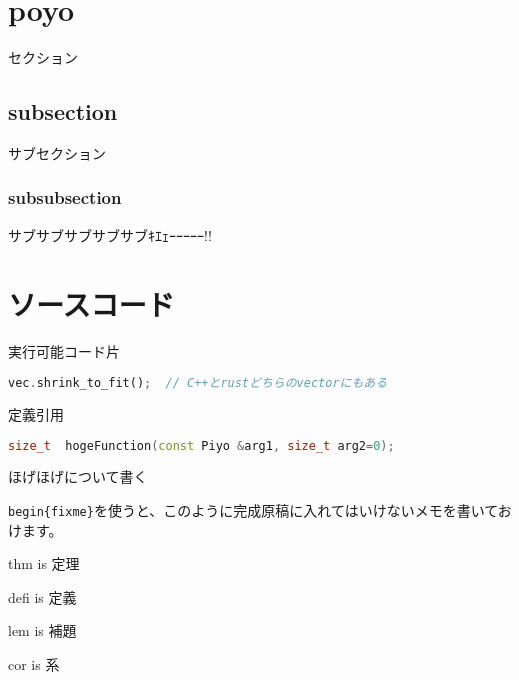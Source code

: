 \documentclass[\rootpath/article.tex]{subfiles}
\begin{document}
\label{14-poyotaro:ch:create-poyopoyo}

\section{poyo}
    セクション

    \subsection{subsection}
        サブセクション

        \subsubsection{subsubsection}
            サブサブサブサブサブｷｴｪｰｰｰｰｰ!!

\section{ソースコード}

    実行可能コード片

    \noindent\begin{minipage}{\textwidth}\mbox{}
\begin{lstlisting}[language=rust,style=code,caption={コードの例}]
vec.shrink_to_fit();  // C++とrustどちらのvectorにもある
\end{lstlisting}%
    \end{minipage}

    定義引用

    \noindent\begin{minipage}{\textwidth}\mbox{}
\begin{lstlisting}[language=c++,style=decleration,caption={宣言の例}]
size_t  hogeFunction(const Piyo &arg1, size_t arg2=0);
\end{lstlisting}%
    \end{minipage}

    \begin{fixme}
        ほげほげについて書く

        \lstinline[language=tex]|begin{fixme}|を使うと、このように完成原稿に入れてはいけないメモを書いておけます。
    \end{fixme}

    \begin{thm}
        thm is 定理
    \end{thm}
    \begin{defi}
        defi is 定義
    \end{defi}
    \begin{lem}
        lem is 補題
    \end{lem}
    \begin{cor}
        cor is 系
    \end{cor}
\end{document}
